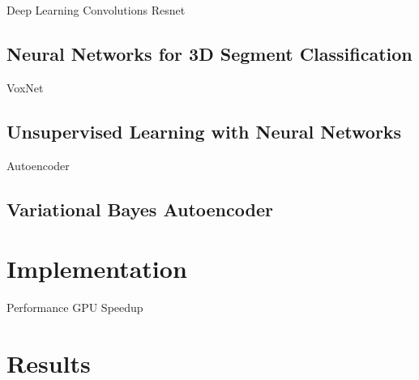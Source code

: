 Deep Learning
  Convolutions
  Resnet

\subsection{Neural Networks for 3D Segment Classification}
\label{subsec:voxnet}
VoxNet

\subsection{Unsupervised Learning with Neural Networks}
\label{subsec:autoencoder}
Autoencoder

\subsection{Variational Bayes Autoencoder}
\label{subsec:variational-bayes}

\section{Implementation}
\label{sec:ae-implementation}

Performance
GPU Speedup

\section{Results}
\label{sec:ae-results}


